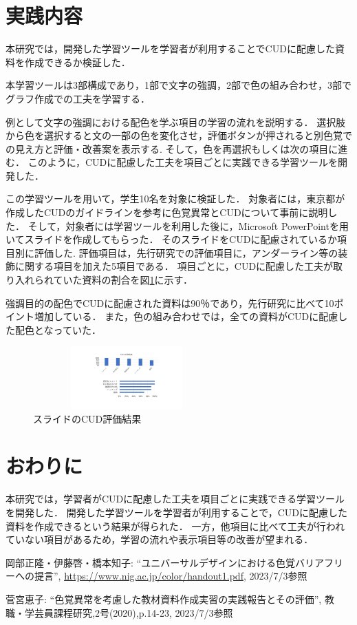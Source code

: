 \documentclass[twocolumn,10pt,a4j]{ltjsarticle}
\begin{document}
\section{実践内容}
本研究では，開発した学習ツールを学習者が利用することでCUDに配慮した資料を作成できるか検証した．

本学習ツールは3部構成であり，1部で文字の強調，2部で色の組み合わせ，3部でグラフ作成での工夫を学習する．


例として文字の強調における配色を学ぶ項目の学習の流れを説明する．
選択肢から色を選択すると文の一部の色を変化させ，評価ボタンが押されると別色覚での見え方と評価・改善案を表示する.
そして，色を再選択もしくは次の項目に進む．
このように，CUDに配慮した工夫を項目ごとに実践できる学習ツールを開発した．

この学習ツールを用いて，学生10名を対象に検証した．
対象者には，東京都が作成したCUDのガイドラインを参考に色覚異常とCUDについて事前に説明した．
そして，対象者には学習ツールを利用した後に，Microsoft PowerPointを用いてスライドを作成してもらった．
そのスライドをCUDに配慮されているか項目別に評価した.
評価項目は，先行研究での評価項目に，アンダーライン等の装飾に関する項目を加えた5項目である．
項目ごとに，CUDに配慮した工夫が取り入れられていた資料の割合を図\ref{fig:result}に示す．

強調目的の配色でCUDに配慮された資料は90％であり，先行研究に比べて10ポイント増加している．
また，色の組み合わせでは，全ての資料がCUDに配慮した配色となっていた．

\begin{figure}[h]
\begin{center}
 \includegraphics[clip,width=72mm,height=24mm]{images/result.pdf}
\end{center}
 \caption{スライドのCUD評価結果}
 \label{fig:result}
\end{figure}



\section{おわりに}
本研究では，学習者がCUDに配慮した工夫を項目ごとに実践できる学習ツールを開発した．
開発した学習ツールを学習者が利用することで，CUDに配慮した資料を作成できるという結果が得られた．
一方，他項目に比べて工夫が行われていない項目があるため，学習の流れや表示項目等の改善が望まれる．




\begin{thebibliography}{99}
岡部正隆・伊藤啓・橋本知子: ``ユニバーサルデザインにおける色覚バリアフリーへの提言'', \url{https://www.nig.ac.jp/color/handout1.pdf}, 2023/7/3参照

 菅宮恵子: ``色覚異常を考慮した教材資料作成実習の実践報告とその評価'', 教職・学芸員課程研究,2号(2020),p.14-23, 2023/7/3参照
\end{thebibliography}
\end{document}
